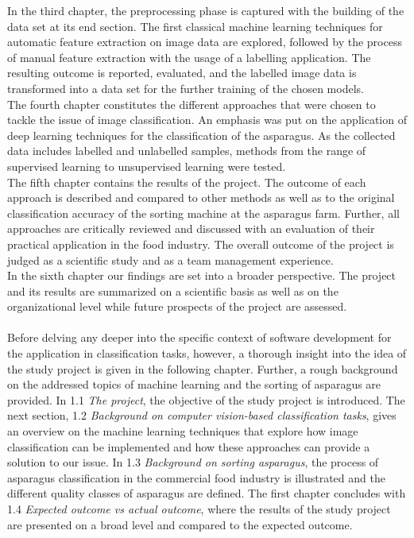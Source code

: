 In the third chapter, the preprocessing phase is captured with the building of the data set at its end section. The first classical machine learning techniques for automatic feature extraction on image data are explored, followed by the process of manual feature extraction with the usage of a labelling application. The resulting outcome is reported, evaluated, and the labelled image data is transformed into a data set for the further training of the chosen models. \\
The fourth chapter constitutes the different approaches that were chosen to tackle the issue of image classification. An emphasis was put on the application of deep learning techniques for the classification of the asparagus. As the collected data includes labelled and unlabelled samples, methods from the range of supervised learning to unsupervised learning were tested. \\
The fifth chapter contains the results of the project. The outcome of each approach is described and compared to other methods as well as to the original classification accuracy of the sorting machine at the asparagus farm. Further, all approaches are critically reviewed and discussed with an evaluation of their practical application in the food industry. The overall outcome of the project is judged as a scientific study and as a team management experience. \\
In the sixth chapter our findings are set into a broader perspective. The project and its results are summarized on a scientific basis as well as on the organizational level while future prospects of the project are assessed. \\
 \\
Before delving any deeper into the specific context of software development for the application in classification tasks, however, a thorough insight into the idea of the study project is given in the following chapter. Further, a rough background on the addressed topics of machine learning and the sorting of asparagus are provided.
In 1.1 \textit{The project}, the objective of the study project is introduced. The next section, 1.2 \textit{Background on computer vision-based classification tasks}, gives an overview on the machine learning techniques that explore how image classification can be implemented and how these approaches can provide a solution to our issue. In 1.3 \textit{Background on sorting asparagus}, the process of asparagus classification in the commercial food industry is illustrated and the different quality classes of asparagus are defined. The first chapter concludes with 1.4 \textit{Expected outcome vs actual outcome}, where the results of the study project are presented on a broad level and compared to the expected outcome.


